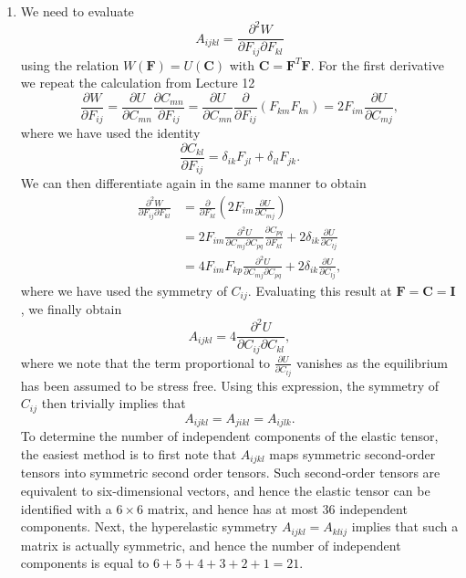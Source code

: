 \documentclass[a4paper,10pt]{paper}
\begin{document}
\begin{enumerate}
\item We need to evaluate
\begin{equation*}
    A_{ijkl}=\frac{\partial^{2}W}{\partial F_{ij}\partial F_{kl}}
\end{equation*}
using the relation $W(\mathbf{F})=U(\mathbf{C})$ with $\mathbf{C}=\mathbf{F}^{T}\mathbf{F}$. For the first derivative we repeat the calculation from Lecture 12
\begin{equation*}
    \frac{\partial W}{\partial F_{ij}}=\frac{\partial U}{\partial C_{mn}}\frac{\partial C_{mn}}{\partial F_{ij}}=\frac{\partial U}{\partial C_{mn}}\frac{\partial}{\partial F_{ij}}(F_{km}F_{kn})=2F_{im}\frac{\partial U}{\partial C_{mj}},
\end{equation*}
where we have used the identity
\begin{equation*}
    \frac{\partial C_{kl}}{\partial F_{ij}}=\delta_{ik}F_{jl}+\delta_{il}F_{jk}.
\end{equation*}
We can then differentiate again in the same manner to obtain
\begin{align*}
    \frac{\partial^2 W}{\partial F_{ij}\partial F_{kl}} &= \frac{\partial}{\partial F_{kl}}\left(2F_{im}\frac{\partial U}{\partial C_{mj}}\right) \\
    &= 2F_{im}\frac{\partial^{2}U}{\partial C_{mj}\partial C_{pq}}\frac{\partial C_{pq}}{\partial F_{kl}}+2\delta_{ik}\frac{\partial U}{\partial C_{lj}} \\
    &= 4F_{im}F_{kp}\frac{\partial^{2}U}{\partial C_{mj}\partial C_{pq}}+2\delta_{ik}\frac{\partial U}{\partial C_{lj}},
\end{align*}
where we have used the symmetry of $C_{ij}$. Evaluating this result at $\mathbf{F}=\mathbf{C}=\mathbf{I}$, we finally obtain
\begin{equation*}
    A_{ijkl}=4\frac{\partial^{2}U}{\partial C_{ij}\partial C_{kl}},
\end{equation*}
where we note that the term proportional to $\frac{\partial U}{\partial C_{lj}}$ vanishes as the equilibrium has been assumed to be stress free. Using this expression, the symmetry of $C_{ij}$ then trivially implies that
\begin{equation*}
    A_{ijkl}=A_{jikl}=A_{ijlk}.
\end{equation*}
To determine the number of independent components of the elastic tensor, the easiest method is to first note that $A_{ijkl}$ maps symmetric second-order tensors into symmetric second order tensors. Such second-order tensors are equivalent to six-dimensional vectors, and hence the elastic tensor can be identified with a $6\times6$ matrix, and hence has at most 36 independent components. Next, the hyperelastic symmetry $A_{ijkl}=A_{klij}$ implies that such a matrix is actually symmetric, and hence the number of independent components is equal to $6+5+4+3+2+1=21$.


\end{enumerate}
\end{document}
